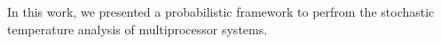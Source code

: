In this work, we presented a probabilistic framework to perfrom the stochastic temperature analysis of multiprocessor systems.
